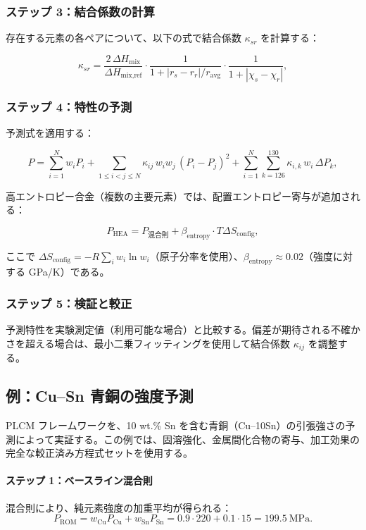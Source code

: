 \documentclass[11pt,a4paper]{article}
\theoremstyle{remark}
\begin{document}
	\subsubsection{ステップ 3：結合係数の計算}
	
	存在する元素の各ペアについて、以下の式で結合係数 \(\kappa_{sr}\) を計算する：
	
	\[
	\kappa_{sr} = \frac{2\,\Delta H_{\text{mix}}}{\Delta H_{\text{mix,ref}}} \cdot
	\frac{1}{1 + |r_s - r_r|/r_{\text{avg}}} \cdot
	\frac{1}{1 + |\chi_s - \chi_r|},
	\]
	
	\subsubsection{ステップ 4：特性の予測}
	
	予測式を適用する：
	
	\[
	P = \sum_{i=1}^{N} w_i P_i
	+ \sum_{1\le i<j\le N} \kappa_{ij}\, w_i w_j\, (P_i - P_j)^2
	+ \sum_{i=1}^{N} \sum_{k=126}^{130} \kappa_{i,k}\, w_i\, \Delta P_k,
	\]
	
	高エントロピー合金（複数の主要元素）では、配置エントロピー寄与が追加される：
	
	\[
	P_{\text{HEA}} = P_{\text{混合則}} + \beta_{\text{entropy}} \cdot T \Delta S_{\text{config}},
	\]
	
	ここで \(\Delta S_{\text{config}} = -R \sum_i w_i \ln w_i\)（原子分率を使用）、\(\beta_{\text{entropy}} \approx 0.02\)（強度に対する GPa/K）である。
	
	\subsubsection{ステップ 5：検証と較正}
	
	予測特性を実験測定値（利用可能な場合）と比較する。偏差が期待される不確かさを超える場合は、最小二乗フィッティングを使用して結合係数 \(\kappa_{ij}\) を調整する。
	
	\subsection{例：Cu–Sn 青銅の強度予測}
	\label{subsec:example-bronze}
	
	PLCM フレームワークを、10 wt.\% Sn を含む青銅（Cu–10Sn）の引張強さの予測によって実証する。この例では、固溶強化、金属間化合物の寄与、加工効果の完全な較正済み方程式セットを使用する。
	
	\paragraph{ステップ 1：ベースライン混合則}
	混合則により、純元素強度の加重平均が得られる：
	\[
	P_{\text{ROM}} = w_{\text{Cu}} P_{\text{Cu}} + w_{\text{Sn}} P_{\text{Sn}} = 0.9 \cdot 220 + 0.1 \cdot 15 = 199.5\ \text{MPa}.
	\]
	
\end{document}
